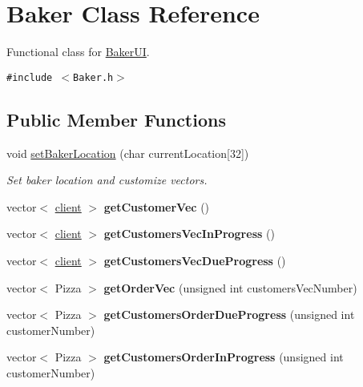 \hypertarget{class_baker}{
\section{Baker Class Reference}
\label{class_baker}
}
Functional class for \hyperlink{class_baker_u_i}{Baker\-UI}.  


{\tt \#include $<$Baker.h$>$}

\subsection*{Public Member Functions}
\begin{CompactItemize}
\item 
void \hyperlink{class_baker_b85151ecb20282d81b4dab489fea7dd8}{set\-Baker\-Location} (char current\-Location\mbox{[}32\mbox{]})
\begin{CompactList}\small\item\em Set baker location and customize vectors. \item\end{CompactList}\item 
\hypertarget{class_baker_3970b0afe27b514282442b11592e1602}{
vector$<$ \hyperlink{classclient}{client} $>$ {\bf get\-Customer\-Vec} ()}
\label{class_baker_3970b0afe27b514282442b11592e1602}

\item 
\hypertarget{class_baker_8b798f098bfd9a23b11fa1d63d089609}{
vector$<$ \hyperlink{classclient}{client} $>$ {\bf get\-Customers\-Vec\-In\-Progress} ()}
\label{class_baker_8b798f098bfd9a23b11fa1d63d089609}

\item 
\hypertarget{class_baker_4c05936fa38e14b768511921a3288c57}{
vector$<$ \hyperlink{classclient}{client} $>$ {\bf get\-Customers\-Vec\-Due\-Progress} ()}
\label{class_baker_4c05936fa38e14b768511921a3288c57}

\item 
\hypertarget{class_baker_ad0cbeddec394b25c5eade57247f4110}{
vector$<$ Pizza $>$ {\bf get\-Order\-Vec} (unsigned int customers\-Vec\-Number)}
\label{class_baker_ad0cbeddec394b25c5eade57247f4110}

\item 
\hypertarget{class_baker_7c9256e53372bd3a698e40cf64003c50}{
vector$<$ Pizza $>$ {\bf get\-Customers\-Order\-Due\-Progress} (unsigned int customer\-Number)}
\label{class_baker_7c9256e53372bd3a698e40cf64003c50}

\item 
\hypertarget{class_baker_96a7c1ec2dc23919a4e7ca8c399476e1}{
vector$<$ Pizza $>$ {\bf get\-Customers\-Order\-In\-Progress} (unsigned int customer\-Number)}
\label{class_baker_96a7c1ec2dc23919a4e7ca8c399476e1}


\end{CompactItemize}
